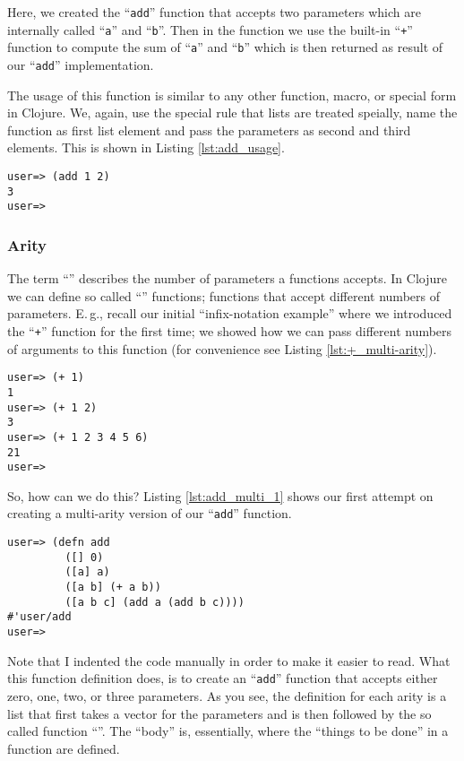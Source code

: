 Here, we created the ``\texttt{add}'' function that accepts two parameters which are internally called ``\texttt{a}'' and ``\texttt{b}''.
Then in the function we use the built-in ``\texttt{+}'' function to compute the sum of ``\texttt{a}'' and ``\texttt{b}'' which is then returned as result of our ``\texttt{add}'' implementation.

The usage of this function is similar to any other function, macro, or special form in Clojure.
We, again, use the special rule that lists are treated speially, name the function as first list element and pass the parameters as second and third elements.
This is shown in Listing \vref{lst:add_usage}.

\begin{lstlisting}[label=lst:add_usage, caption=Using our own Function with Parameters]
user=> (add 1 2)
3
user=>  
\end{lstlisting}

\subsubsection{Arity}
The term ``'' describes the number of parameters a functions accepts.
In Clojure we can define so called ``'' functions; 
functions that accept different numbers of parameters.
E.\,g., recall our initial ``infix-notation example'' where we introduced the ``\texttt{+}'' function for the first time;
we showed how we can pass different numbers of arguments to this function (for convenience see Listing \vref{lst:+_multi-arity}).

\begin{lstlisting}[label=lst:+_multi-arity, caption=The ``\texttt{+}'' function accepts different numbers of arguments.]
user=> (+ 1)
1
user=> (+ 1 2)
3
user=> (+ 1 2 3 4 5 6)
21
user=>  
\end{lstlisting}

So, how can we do this?
Listing \vref{lst:add_multi_1} shows our first attempt on creating a multi-arity version of our ``\texttt{add}'' function.

\begin{lstlisting}[label=lst:add_multi_1, caption=First Try on a Multi-arity Function]
user=> (defn add
         ([] 0)
         ([a] a)
         ([a b] (+ a b))
         ([a b c] (add a (add b c))))
#'user/add
user=>  
\end{lstlisting}

Note that I indented the code manually in order to make it easier to read.
What this function definition does, is to create an ``\texttt{add}'' function that accepts either zero, one, two, or three parameters.
As you see, the definition for each arity is a list that first takes a vector for the parameters and is then followed by the so called function ``''.
The ``body'' is, essentially, where the ``things to be done'' in a function are defined.

